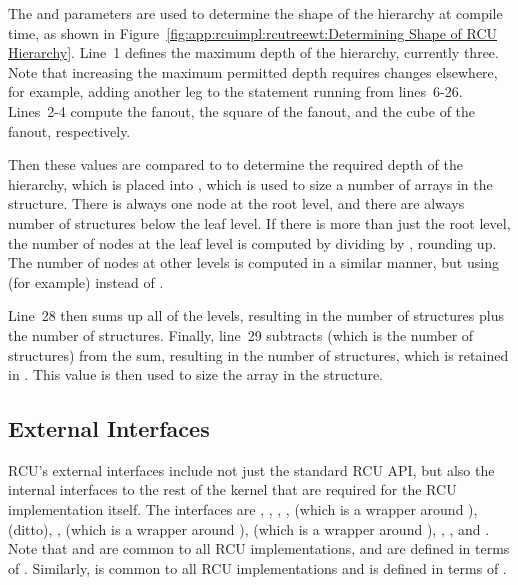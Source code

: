 The  and  parameters are used to
determine the shape of the  hierarchy at compile time,
as shown in
Figure~\ref{fig:app:rcuimpl:rcutreewt:Determining Shape of RCU Hierarchy}.
Line~1 defines the maximum depth of the  hierarchy,
currently three.
Note that increasing the maximum permitted depth requires changes
elsewhere, for example, adding another leg to the 
statement running from lines~6-26.
Lines~2-4 compute the fanout, the square of the fanout, and the cube
of the fanout, respectively.

Then these values are compared to  to determine the required
depth of the  hierarchy, which is placed into
, which is used to size a number of arrays
in the  structure.
There is always one node at the root level, and there are always
 number of  structures below the leaf
level.
If there is more than just the root level, the number of nodes at
the leaf level is computed
by dividing  by , rounding up.
The number of nodes at other levels is computed in a similar manner,
but using (for example)  instead of .

Line~28 then sums up all of the levels, resulting in the number of
 structures plus the number of  structures.
Finally, line~29 subtracts  (which is the number of
 structures) from the sum, resulting in the number
of  structures, which is retained in
.
This value is then used to size the  array in the
 structure.

\subsection{External Interfaces}
\label{app:rcuimpl:rcutreewt:External Interfaces}

RCU's external interfaces include not just the standard RCU API,
but also the internal interfaces to the rest of the kernel that
are required for the RCU implementation itself.
The interfaces are
,
,
,
,
 (which is a wrapper around
),
 (ditto),
,
 (which is a wrapper around
),
 (which is a wrapper around
),
,
, and
.
Note that  and  are
common to all RCU implementations, and are defined in terms of
.
Similarly,  is common to all RCU implementations
and is defined in terms of .

